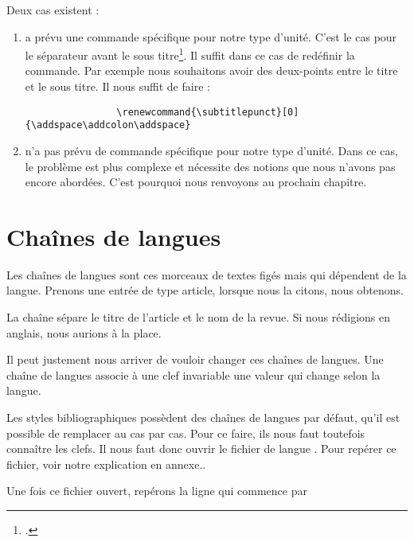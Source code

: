 	Deux cas existent :
		\begin{enumerate}
			\item {} a prévu une commande spécifique pour notre type d'unité. C'est le cas pour le séparateur avant le sous titre\footcite[Ces commandes sont peu nombreuse : on les trouvera dans][89-91]{biblatex}. Il suffit dans ce cas de redéfinir la commande. Par exemple nous souhaitons avoir des deux-points entre le titre et le sous titre. Il nous suffit de faire :
			\begin{verbatim}
				\renewcommand{\subtitlepunct}[0]{\addspace\addcolon\addspace}
			\end{verbatim}
			
			\item {} n'a pas prévu de commande spécifique pour notre type d'unité. Dans ce cas, le problème est plus complexe et nécessite des notions que nous n'avons pas encore abordées. C'est pourquoi nous renvoyons au prochain chapitre.
		\end{enumerate}
		
	\section{Chaînes de langues}
	
	Les chaînes de langues sont ces morceaux de textes figés mais qui dépendent de la langue. Prenons une entrée de type article, lorsque nous la citons, nous obtenons.
	
	\begin{quotation}
		\cite{Amsler1997}
	\end{quotation}
	
	La chaîne  sépare le titre de l'article et le nom de la revue. Si nous rédigions en anglais, nous aurions  à la place. 
	
	Il peut justement nous arriver de vouloir changer ces chaînes de langues. Une chaîne de langues associe à une clef invariable une valeur qui change selon la langue.
	
	Les styles bibliographiques possèdent des chaînes de langues par défaut, qu'il est possible de remplacer au cas par cas. Pour ce faire, ils nous faut toutefois connaître les clefs. Il nous faut donc ouvrir le fichier de langue . Pour repérer ce fichier, voir notre explication en annexe..
	
	Une fois ce fichier ouvert, repérons la ligne qui commence par
	
